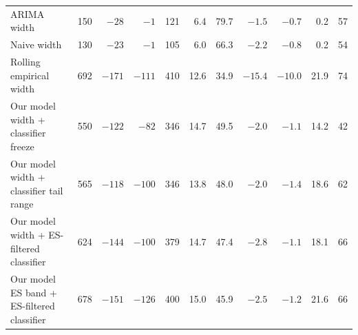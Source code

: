 \begin{table}[pos=!htbp,align=\centering]
{\begin{tabular}{lrrrrrrrrrr}
ARIMA width & 150 & $-28$ & $-1$ & 121 & 6.4 & 79.7 & $-1.5$ & $-0.7$ & 0.2 & 57 \\
Naive width & 130 & $-23$ & $-1$ & 105 & 6.0 & 66.3 & $-2.2$ & $-0.8$ & 0.2 & 54 \\
Rolling empirical width & 692 & $-171$ & $-111$ & 410 & 12.6 & 34.9 & $-15.4$ & $-10.0$ & 21.9 & 74 \\
Our model width + classifier freeze & 550 & $-122$ & $-82$ & 346 & 14.7 & 49.5 & $-2.0$ & $-1.1$ & 14.2 & 42 \\
Our model width + classifier tail range & 565 & $-118$ & $-100$ & 346 & 13.8 & 48.0 & $-2.0$ & $-1.4$ & 18.6 & 62 \\
Our model width + ES-filtered classifier & 624 & $-144$ & $-100$ & 379 & 14.7 & 47.4 & $-2.8$ & $-1.1$ & 18.1 & 66 \\
Our model ES band + ES-filtered classifier & 678 & $-151$ & $-126$ & 400 & 15.0 & 45.9 & $-2.5$ & $-1.2$ & 21.6 & 66 \\
\bottomrule
\end{tabular}
}
\end{table}

\begin{table}[pos=!htbp,align=\centering]
\centering
\caption{Placebo test of classifier timing: 500 schedules placing the classifier's 43 alert
episodes, with their durations, at random dates under the same freeze rule. The $p$-value is
the share of placebo schedules performing at least as well as the classifier.}
\label{tab:lp_placebo}
\end{table}

